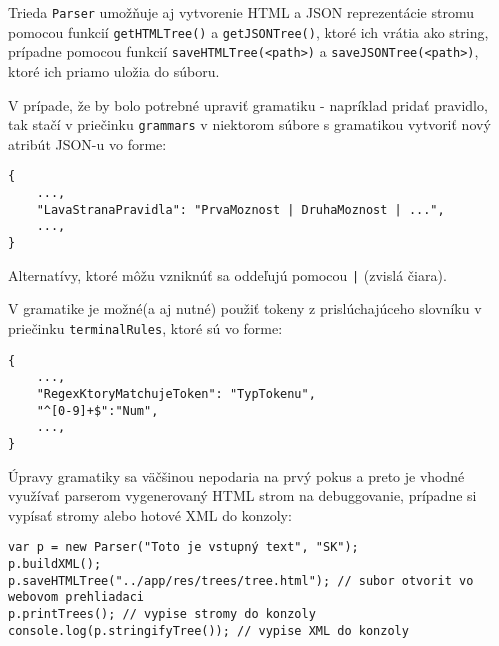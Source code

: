 \documentclass[12pt,a4paper]{report}
\theoremstyle{definition}
\theoremstyle{remark}
\begin{document}
Trieda \verb!Parser! umožňuje aj vytvorenie HTML a JSON reprezentácie stromu pomocou funkcií \verb!getHTMLTree()! a \verb!getJSONTree()!, ktoré ich vrátia ako string, prípadne pomocou funkcií \verb!saveHTMLTree(<path>)! a \verb!saveJSONTree(<path>)!, ktoré ich priamo uložia do súboru.

V prípade, že by bolo potrebné upraviť gramatiku - napríklad pridať pravidlo, tak stačí v priečinku \verb!grammars! v niektorom súbore s gramatikou vytvoriť nový atribút JSON-u vo forme:
 \begin{lstlisting}[style=htmlcssjs]
{
	...,
	"LavaStranaPravidla": "PrvaMoznost | DruhaMoznost | ...",
	...,
}
\end{lstlisting}
Alternatívy, ktoré môžu vzniknúť sa oddeľujú pomocou \verb!|! (zvislá čiara).

V gramatike je možné(a aj nutné) použiť tokeny z prislúchajúceho slovníku v priečinku \verb!terminalRules!, ktoré sú vo forme:
\begin{lstlisting}[style=htmlcssjs]
{
	...,
	"RegexKtoryMatchujeToken": "TypTokenu",
	"^[0-9]+$":"Num",
	...,
}
\end{lstlisting}

Úpravy gramatiky sa väčšinou nepodaria na prvý pokus a preto je vhodné využívať parserom vygenerovaný HTML strom na debuggovanie, prípadne si vypísať stromy alebo hotové XML do konzoly:
\begin{lstlisting}[style=htmlcssjs]
var p = new Parser("Toto je vstupný text", "SK");
p.buildXML();
p.saveHTMLTree("../app/res/trees/tree.html"); // subor otvorit vo webovom prehliadaci
p.printTrees(); // vypise stromy do konzoly
console.log(p.stringifyTree()); // vypise XML do konzoly
\end{lstlisting}
\end{document}
